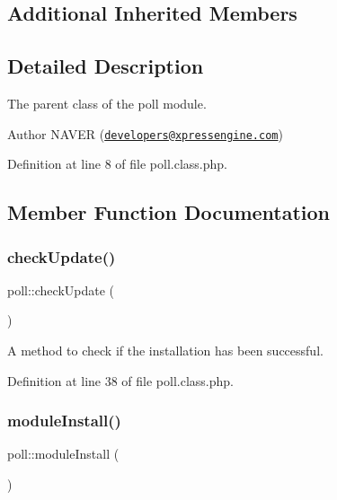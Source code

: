 \subsection*{Additional Inherited Members}


\subsection{Detailed Description}
The parent class of the poll module. 

\begin{DoxyAuthor}{Author}
N\+A\+V\+ER (\href{mailto:developers@xpressengine.com}{\tt developers@xpressengine.\+com}) 
\end{DoxyAuthor}


Definition at line 8 of file poll.\+class.\+php.



\subsection{Member Function Documentation}
\mbox{\label{classpoll_a42546dbd4aeb7d1bc60a0353c5922f36}} 
\subsubsection{\texorpdfstring{check\+Update()}{checkUpdate()}}
{\footnotesize\ttfamily poll\+::check\+Update (\begin{DoxyParamCaption}{ }\end{DoxyParamCaption})}



A method to check if the installation has been successful. 



Definition at line 38 of file poll.\+class.\+php.

\mbox{\label{classpoll_a21a07b0e65ffb1727542bb95a72386c9}} 
\subsubsection{\texorpdfstring{module\+Install()}{moduleInstall()}}
{\footnotesize\ttfamily poll\+::module\+Install (\begin{DoxyParamCaption}{ }\end{DoxyParamCaption})}



